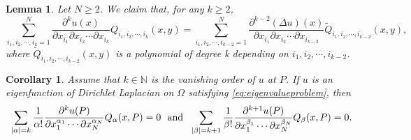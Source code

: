 \documentclass[10pt,a4paper]{amsart}
\newtheorem{lemma}{Lemma}
\newtheorem{cor}{Corollary}
\newcommand\N{\mathbb N}
\renewcommand\O\Omega
\begin{document}
       \begin{lemma}\label{lem10102025-1}
             Let $N\ge 2$.   We claim that, for any  $k\ge2$,
					\begin{equation}\label{eq1609-1}
						\sum_{i_1,i_2,\cdots,i_k=1}^{N}\frac{\partial^k u(x)}{\partial x_{i_1} \partial x_{i_2}\cdots \partial x_{i_k}}Q_{i_1,i_2,\cdots,i_k}(x,y)=	\sum_{i_1,i_2,\cdots,i_{k-2}=1}^{N}\frac{\partial^{k-2}(\Delta u) (x)}{\partial x_{i_1} \partial x_{i_2}\cdots \partial x_{i_{k-2}}} \widetilde{Q}_{i_1,i_2,\cdots,i_{k-2}}(x,y),
					\end{equation}
					where $\widetilde{Q}_{i_1,i_2,\cdots,i_{k-2}}(x,y)$ is a polynomial of degree k depending on $i_1,i_2,\cdots,i_{k-2}$.
            \end{lemma}

                 \begin{cor}\label{Cor-Q}
                 Assume that $k\in\N$ is the vanishing order of $u$ at $P$.
                     If $u$ is an eigenfunction of Dirichlet Laplacian on $\O$ satisfying \eqref{eq:eigenvalueproblem}, then
                      \begin{equation}\label{eq2904-2}
					\sum_{|\alpha|=k}\frac1{\alpha!}
					\frac{\partial^ku(P)}{\partial x_1^{\alpha_1}\cdots\partial x_N^{\alpha_N}}Q_\alpha(x,P)=0\ \ \hbox{and}\ \ 	\sum_{|\beta|=k+1}\frac1{\beta!}
					\frac{\partial^{k+1}u(P)}{\partial x_1^{\beta_1}\cdots\partial x_N^{\beta_N}}Q_\beta(x,P)=0.
				\end{equation}   
                 \end{cor}  
\end{document}

